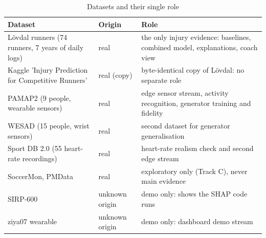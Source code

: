 \begin{table}[t]\centering\caption{Datasets and their single role}\label{tab:data}
\footnotesize\begin{tabular}{p{2.6cm}p{1.2cm}p{3.6cm}}\toprule
Dataset & Origin & Role \\\midrule
Lövdal runners (74 runners, 7 years of daily logs) & real & the only injury evidence: baselines, combined model, explanations, coach view \\
Kaggle 'Injury Prediction for Competitive Runners' & real (copy) & byte-identical copy of Lövdal: no separate role \\
PAMAP2 (9 people, wearable sensors) & real & edge sensor stream, activity recognition, generator training and fidelity \\
WESAD (15 people, wrist sensors) & real & second dataset for generator generalisation \\
Sport DB 2.0 (55 heart-rate recordings) & real & heart-rate realism check and second edge stream \\
SoccerMon, PMData & real & exploratory only (Track C), never main evidence \\
SIRP-600 & unknown origin & demo only: shows the SHAP code runs \\
ziya07 wearable & unknown origin & demo only: dashboard demo stream \\
\bottomrule\end{tabular}\end{table}
